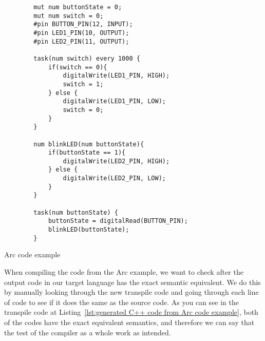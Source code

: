 \begin{listing}[htb!]
    \begin{verbatim}
        mut num buttonState = 0;
        mut num switch = 0;
        #pin BUTTON_PIN(12, INPUT);
        #pin LED1_PIN(10, OUTPUT);
        #pin LED2_PIN(11, OUTPUT);

        task(num switch) every 1000 {
            if(switch == 0){
                digitalWrite(LED1_PIN, HIGH);
                switch = 1;
            } else {
                digitalWrite(LED1_PIN, LOW);
                switch = 0;
            }
        }

        num blinkLED(num buttonState){
            if(buttonState == 1){
                digitalWrite(LED2_PIN, HIGH);
            } else {
                digitalWrite(LED2_PIN, LOW);
            }
        }

        task(num buttonState) {
            buttonState = digitalRead(BUTTON_PIN);
            blinkLED(buttonState);
        }
    \end{verbatim}
    \caption{Arc code example}
    \label{lst:arc code example}
\end{listing}

When compiling the code from the Arc example, we want to check after the output code in our target language has the exact semantic equivalent. We do this by manually looking through the new transpile code and going through each line of code to see if it does the same as the source code. As you can see in the transpile code at Listing~\ref{lst:generated C++ code from Arc code example}, both of the codes have the exact equivalent semantics, and therefore we can say that the test of the compiler as a whole work as intended.

